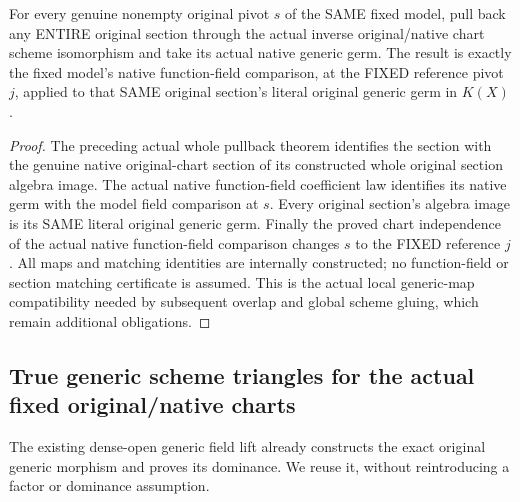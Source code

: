 \begin{theorem}
\label{thm:seven-fixed-original-native-chart-generic-germs-route}
\leanok
{}
For every genuine nonempty original pivot $s$ of the SAME fixed model,
pull back any ENTIRE original section through the actual inverse
original/native chart scheme isomorphism and take its actual native
generic germ. The result is exactly the fixed model's native function-field
comparison, at the FIXED reference pivot $j$, applied to that SAME original
section's literal original generic germ in $K(X)$.
\end{theorem}
\begin{proof}
The preceding actual whole pullback theorem identifies the section with
the genuine native original-chart section of its constructed whole original
section algebra image. The actual native function-field coefficient law
identifies its native germ with the model field comparison at $s$. Every
original section's algebra image is its SAME literal original generic germ.
Finally the proved chart independence of the actual native function-field
comparison changes $s$ to the FIXED reference $j$. All maps and matching
identities are internally constructed; no function-field or section
matching certificate is assumed. This is the actual local generic-map
compatibility needed by subsequent overlap and global scheme gluing,
which remain additional obligations.
\end{proof}

\subsection{True generic scheme triangles for the actual fixed original/native charts}
The existing dense-open generic field lift already constructs the exact
original generic morphism and proves its dominance. We reuse it, without
reintroducing a factor or dominance assumption.

